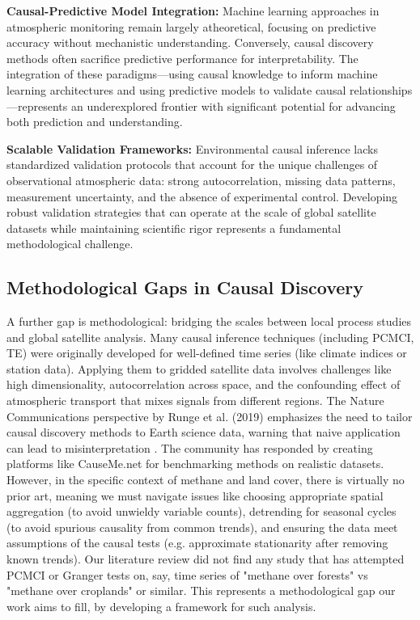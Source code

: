 \textbf{Causal-Predictive Model Integration:} Machine learning approaches in atmospheric monitoring remain largely atheoretical, focusing on predictive accuracy without mechanistic understanding. Conversely, causal discovery methods often sacrifice predictive performance for interpretability. The integration of these paradigms—using causal knowledge to inform machine learning architectures and using predictive models to validate causal relationships—represents an underexplored frontier with significant potential for advancing both prediction and understanding.

\textbf{Scalable Validation Frameworks:} Environmental causal inference lacks standardized validation protocols that account for the unique challenges of observational atmospheric data: strong autocorrelation, missing data patterns, measurement uncertainty, and the absence of experimental control. Developing robust validation strategies that can operate at the scale of global satellite datasets while maintaining scientific rigor represents a fundamental methodological challenge.

\subsection{Methodological Gaps in Causal Discovery}

A further gap is methodological: bridging the scales between local process studies and global satellite analysis. Many causal inference techniques (including PCMCI, TE) were originally developed for well-defined time series (like climate indices or station data). Applying them to gridded satellite data involves challenges like high dimensionality, autocorrelation across space, and the confounding effect of atmospheric transport that mixes signals from different regions. The Nature Communications perspective by Runge et al. (2019) \cite{Runge2019} emphasizes the need to tailor causal discovery methods to Earth science data, warning that naive application can lead to misinterpretation \cite{Runge2019}. The community has responded by creating platforms like CauseMe.net \cite{Runge2019, Runge2019_2, MunozMari2020} for benchmarking methods on realistic datasets. However, in the specific context of methane and land cover, there is virtually no prior art, meaning we must navigate issues like choosing appropriate spatial aggregation (to avoid unwieldy variable counts), detrending for seasonal cycles (to avoid spurious causality from common trends), and ensuring the data meet assumptions of the causal tests (e.g. approximate stationarity after removing known trends). Our literature review did not find any study that has attempted PCMCI or Granger tests on, say, time series of "methane over forests" vs "methane over croplands" or similar. This represents a methodological gap our work aims to fill, by developing a framework for such analysis.

